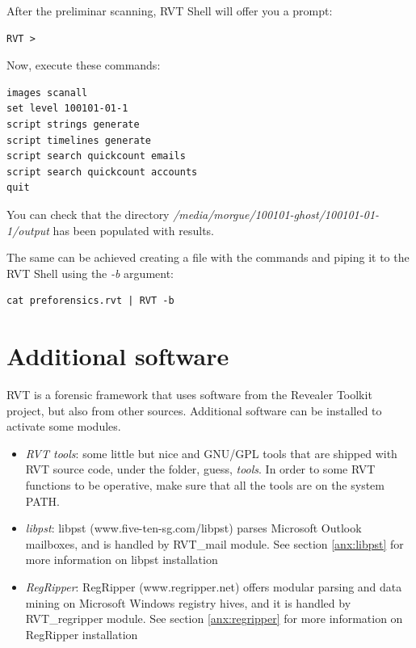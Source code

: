 \documentclass[a4paper,11pt,oneside]{report}
\begin{document}
After the preliminar scanning, RVT Shell will offer you a prompt:

\begin{verbatim}
RVT >
\end{verbatim}

Now, execute these commands:

\begin{verbatim}
images scanall
set level 100101-01-1
script strings generate
script timelines generate
script search quickcount emails
script search quickcount accounts
quit
\end{verbatim}

You can check that the directory \emph{/media/morgue/100101-ghost/100101-01-1/output} has been populated with results.

The same can be achieved creating a file with the commands and piping it to the RVT Shell using the \emph{-b} argument:

\begin{verbatim}
cat preforensics.rvt | RVT -b
\end{verbatim}



\section{Additional software}

RVT is a forensic framework that uses software from the Revealer Toolkit project, but also from other sources. Additional software can be installed to activate some modules.

\begin{itemize}
\item \emph{RVT tools}: some little but nice and GNU/GPL tools that are shipped with RVT source code, under the folder, guess, \emph{tools}. In order to some RVT functions to be operative, make sure that all the tools are on the system PATH.
\item \emph{libpst}:  libpst (www.five-ten-sg.com/libpst) parses Microsoft Outlook mailboxes, and is handled by RVT\_mail module. See section \ref{anx:libpst} for more information on libpst installation
\item \emph{RegRipper}:  RegRipper (www.regripper.net) offers modular parsing and data mining on Microsoft Windows registry hives, and it is handled by RVT\_regripper module. See section \ref{anx:regripper} for more information on RegRipper installation
\end{itemize}
\end{document}
